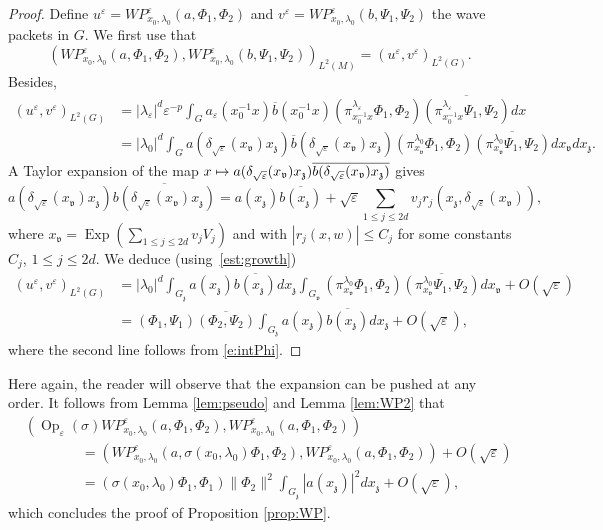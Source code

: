 \documentclass[JEP,XML,SOM,Unicode,published]{cedram}
\newcommand\mto{\mathchoice{\longmapsto}{\mapsto}{\mapsto}{\mapsto}}
\DeclareMathOperator{\Exp}{Exp}
\DeclareMathOperator{\Op}{Op}
\theoremstyle{plain}
\theoremstyle{definition}
\let\eps\varepsilon
\begin{document}
\begin{proof}
Define $u^\eps= WP^\eps_{x_0,\lambda_0} (a,\Phi_1,\Phi_2)$ and $v^\eps= WP^\eps_{x_0,\lambda_0} (b,\Psi_1,\Psi_2)$ the wave packets in $G$. We first use that
\[
\left(WP^\eps_{x_0,\lambda_0} (a,\Phi_1,\Phi_2),WP^\eps_{x_0,\lambda_0} (b,\Psi_1,\Psi_2)\right)_{L^2(M)}=(u^\eps,v^\eps)_{L^2(G)}.
\]
Besides,
\begin{align*}
(u^\eps,v^\eps)_{L^2(G)} & = |\lambda_\eps|^d \eps^{-p} \int _G a_\eps (x_0^{-1} x) \overline b(x_0^{-1} x) (\pi^{\lambda_\eps}_{x_0^{-1} x}\Phi_1,\Phi_2) \overline{ (\pi^{\lambda_\eps}_{x_0^{-1} x}\Psi_1,\Psi_2) } dx\\
&= |\lambda_0|^d \int_G a\left(\delta_{\sqrt\eps} (x_{\mathfrak v}) x_{\mathfrak z}\right)
\overline b \left(\delta_{\sqrt\eps} (x_{\mathfrak v}) x_{\mathfrak z}\right)
(\pi^{\lambda_0}_{x_{\mathfrak v}} \Phi_1,\Phi_2)
\overline{(\pi^{\lambda_0}_{x_{\mathfrak v}} \Psi_1,\Psi_2) } dx_{\mathfrak v} dx_{\mathfrak z}.
\end{align*}
A Taylor expansion of the map $x\mto a(\delta_{\sqrt\eps}(x_{\mathfrak v})x_{\mathfrak z}) \overline{b(\delta_{\sqrt\eps}(x_{\mathfrak v})x_{\mathfrak z}) } $ gives
\[
a(\delta_{\sqrt\eps}(x_{\mathfrak v})x_{\mathfrak z}) \overline{b(\delta_{\sqrt\eps}(x_{\mathfrak v})x_{\mathfrak z}) } =
a(x_{\mathfrak z}) \overline{b(x_{\mathfrak z}) } +\sqrt\eps \sum_{1\leq j\leq 2d} v_j r_j(x_{\mathfrak z},\delta_{\sqrt\eps}(x_{\mathfrak v})),
\]
where $x_{\mathfrak v}=\Exp (\sum_{1\leq j\leq 2d} v_jV_j)$ and with $| r_j(x,w) | \leq C_j$ for some constants $C_j$, $1\leq j\leq 2d$.
We deduce (using~\eqref{est:growth})
\begin{align*}
(u^\eps,v^\eps)_{L^2(G)}&= |\lambda_0|^d \int_{G_{\mathfrak z}} a(x_{\mathfrak z}) \overline{b(x_{\mathfrak z}) } dx_{\mathfrak z}
\int_{G_{\mathfrak v}} (\pi^{\lambda_0}_{x_{\mathfrak v}} \Phi_1,\Phi_2) \overline{ (\pi^{\lambda_0}_{ x_{\mathfrak v}} \Psi_1,\Psi_2)} dx_{\mathfrak v} +O(\sqrt\eps) \\
&= (\Phi_1,\Psi_1)\overline{(\Phi_2,\Psi_2)}\int_{G_{\mathfrak z}} a(x_{\mathfrak z}) \overline{b(x_{\mathfrak z}) } dx_{\mathfrak z} +O(\sqrt \eps),
\end{align*}
where the second line follows from \eqref{e:intPhi}.
\end{proof}
Here again, the reader will observe that the expansion can be pushed at any order. It follows from Lemma \ref{lem:pseudo} and Lemma \ref{lem:WP2} that
\begin{align*}
&(\Op_\eps(\sigma) WP^\eps_{x_0,\lambda_0}(a,\Phi_1,\Phi_2), WP^\eps_{x_0,\lambda_0}(a,\Phi_1,\Phi_2)) \\
&\qquad \qquad = (WP^\eps_{x_0,\lambda_0}(a,\sigma(x_0,\lambda_0)\Phi_1,\Phi_2), WP^\eps_{x_0,\lambda_0}(a,\Phi_1,\Phi_2))+O(\sqrt\eps) \\
&\qquad \qquad =(\sigma(x_0,\lambda_0)\Phi_1,\Phi_1) \|\Phi_2\|^2\int_{G_{\mathfrak z}}|a(x_{\mathfrak z})|^2dx_{\mathfrak z} +O(\sqrt\eps),
\end{align*}
which concludes the proof of Proposition \ref{prop:WP}.
\end{document}
